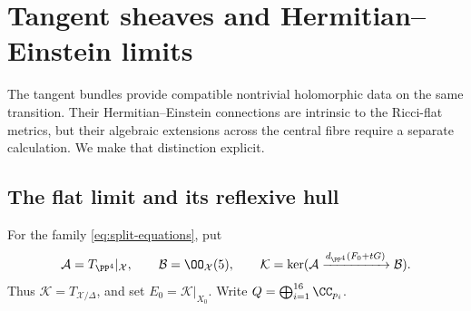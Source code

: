 \section{Tangent sheaves and Hermitian--Einstein limits}\label{sec:tangent}

The tangent bundles provide compatible nontrivial holomorphic data on the
same transition. Their Hermitian--Einstein connections are intrinsic to
the Ricci-flat metrics, but their algebraic extensions across the central
fibre require a separate calculation. We make that distinction explicit.

\subsection{The flat limit and its reflexive hull}
For the family \eqref{eq:split-equations}, put
\[
 \mathcal A=T_{\PP^4}|_{\mathcal X},\qquad
 \mathcal B=\OO_{\mathcal X}(5),\qquad
 \mathcal K=\ker(\mathcal A\xrightarrow{d_{\PP^4}(F_0+tG)}\mathcal B).
\]
Thus $\mathcal K=T_{\mathcal X/\Delta}$, and set
$E_0=\mathcal K|_{X_0}$. Write $Q=\bigoplus_{i=1}^{16}\CC_{p_i}$.

